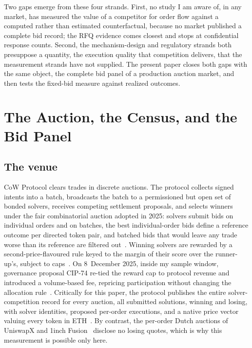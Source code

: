 \documentclass[11pt]{article}
\theoremstyle{plain}
\theoremstyle{definition}
\theoremstyle{remark}
\begin{document}
Two gaps emerge from these four strands. First, no study I am aware of, in any market, has measured the value of a competitor for order flow against a computed rather than estimated counterfactual, because no market published a complete bid record; the RFQ evidence comes closest and stops at confidential response counts. Second, the mechanism-design and regulatory strands both presuppose a quantity, the execution quality that competition delivers, that the measurement strands have not supplied. The present paper closes both gaps with the same object, the complete bid panel of a production auction market, and then tests the fixed-bid measure against realized outcomes.

\section{The Auction, the Census, and the Bid Panel}

\subsection{The venue}\label{sec:venue}
CoW Protocol clears trades in discrete auctions. The protocol collects signed intents into a batch, broadcasts the batch to a permissioned but open set of bonded solvers, receives competing settlement proposals, and selects winners under the fair combinatorial auction adopted in 2025: solvers submit bids on individual orders and on batches, the best individual-order bids define a reference outcome per directed token pair, and batched bids that would leave any trade worse than its reference are filtered out~\citep{cowdao_rules,cowdao_fairauction}. Winning solvers are rewarded by a second-price-flavoured rule keyed to the margin of their score over the runner-up's, subject to caps~\citep{cowdao_rewards}. On 8~December 2025, inside my sample window, governance proposal CIP-74 re-tied the reward cap to protocol revenue and introduced a volume-based fee, repricing participation without changing the allocation rule~\citep{zhang2026incentives}. Critically for this paper, the protocol publishes the entire solver-competition record for every auction, all submitted solutions, winning and losing, with solver identities, proposed per-order executions, and a native price vector valuing every token in ETH~\citep{cow_api}. By contrast, the per-order Dutch auctions of UniswapX and 1inch Fusion~\citep{adams2023uniswapx} disclose no losing quotes, which is why this measurement is possible only here.
\end{document}

